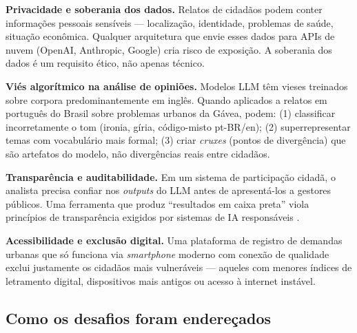\documentclass[12pt,a4paper]{article}
\begin{document}
\textbf{Privacidade e soberania dos dados.}
Relatos de cidadãos podem conter informações pessoais sensíveis — localização,
identidade, problemas de saúde, situação econômica. Qualquer arquitetura que envie
esses dados para APIs de nuvem (OpenAI, Anthropic, Google) cria risco de exposição.
A soberania dos dados é um requisito ético, não apenas técnico.

\textbf{Viés algorítmico na análise de opiniões.}
Modelos LLM têm vieses treinados sobre corpora predominantemente em inglês. Quando
aplicados a relatos em português do Brasil sobre problemas urbanos da Gávea, podem:
(1) classificar incorretamente o tom (ironia, gíria, código-misto pt-BR/en); (2)
superrepresentar temas com vocabulário mais formal; (3) criar \textit{cruxes} (pontos
de divergência) que são artefatos do modelo, não divergências reais entre cidadãos.

\textbf{Transparência e auditabilidade.}
Em um sistema de participação cidadã, o analista precisa confiar nos \textit{outputs} do
LLM antes de apresentá-los a gestores públicos. Uma ferramenta que produz ``resultados em
caixa preta'' viola princípios de transparência exigidos por sistemas de IA responsáveis
\cite{weisz2024}.

\textbf{Acessibilidade e exclusão digital.}
Uma plataforma de registro de demandas urbanas que só funciona via \textit{smartphone}
moderno com conexão de qualidade exclui justamente os cidadãos mais vulneráveis — aqueles
com menores índices de letramento digital, dispositivos mais antigos ou acesso à internet
instável.

\subsection{Como os desafios foram endereçados}
\end{document}
